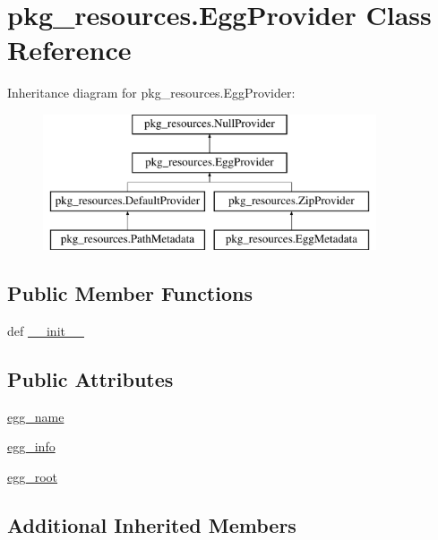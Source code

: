 \hypertarget{classpkg__resources_1_1EggProvider}{}\section{pkg\+\_\+resources.\+Egg\+Provider Class Reference}
\label{classpkg__resources_1_1EggProvider}
Inheritance diagram for pkg\+\_\+resources.\+Egg\+Provider\+:\begin{figure}[H]
\begin{center}
\leavevmode
\includegraphics[height=4.000000cm]{classpkg__resources_1_1EggProvider}
\end{center}
\end{figure}
\subsection*{Public Member Functions}
\begin{DoxyCompactItemize}
\item 
def \hyperlink{classpkg__resources_1_1EggProvider_a05d3b9056d45d0ee9645e5db8abd596a}{\+\_\+\+\_\+init\+\_\+\+\_\+}
\end{DoxyCompactItemize}
\subsection*{Public Attributes}
\begin{DoxyCompactItemize}
\item 
\hyperlink{classpkg__resources_1_1EggProvider_a3ad4e46d4d17d838fa87cd90c9ae5356}{egg\+\_\+name}
\item 
\hyperlink{classpkg__resources_1_1EggProvider_aaf8024857e8194457b41b0a70b76fe02}{egg\+\_\+info}
\item 
\hyperlink{classpkg__resources_1_1EggProvider_a4f493d581c0d65f2d2960d9594138f24}{egg\+\_\+root}
\end{DoxyCompactItemize}
\subsection*{Additional Inherited Members}


